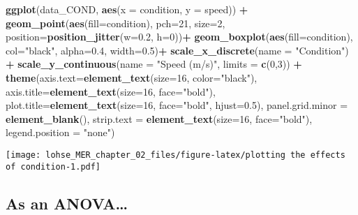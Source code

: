 \documentclass[]{article}
\newenvironment{Shaded}{\begin{snugshade}}{\end{snugshade}}
\newcommand{\DataTypeTok}[1]{\textcolor[rgb]{0.13,0.29,0.53}{#1}}
\newcommand{\DecValTok}[1]{\textcolor[rgb]{0.00,0.00,0.81}{#1}}
\newcommand{\FloatTok}[1]{\textcolor[rgb]{0.00,0.00,0.81}{#1}}
\newcommand{\KeywordTok}[1]{\textcolor[rgb]{0.13,0.29,0.53}{\textbf{#1}}}
\newcommand{\NormalTok}[1]{#1}
\newcommand{\OperatorTok}[1]{\textcolor[rgb]{0.81,0.36,0.00}{\textbf{#1}}}
\newcommand{\StringTok}[1]{\textcolor[rgb]{0.31,0.60,0.02}{#1}}
\begin{document}
\begin{Shaded}
\begin{Highlighting}[]
\KeywordTok{ggplot}\NormalTok{(data\_COND, }\KeywordTok{aes}\NormalTok{(}\DataTypeTok{x =}\NormalTok{ condition, }\DataTypeTok{y =}\NormalTok{ speed)) }\OperatorTok{+}
\StringTok{  }\KeywordTok{geom\_point}\NormalTok{(}\KeywordTok{aes}\NormalTok{(}\DataTypeTok{fill=}\NormalTok{condition), }\DataTypeTok{pch=}\DecValTok{21}\NormalTok{, }\DataTypeTok{size=}\DecValTok{2}\NormalTok{,}
             \DataTypeTok{position=}\KeywordTok{position\_jitter}\NormalTok{(}\DataTypeTok{w=}\FloatTok{0.2}\NormalTok{, }\DataTypeTok{h=}\DecValTok{0}\NormalTok{))}\OperatorTok{+}
\StringTok{  }\KeywordTok{geom\_boxplot}\NormalTok{(}\KeywordTok{aes}\NormalTok{(}\DataTypeTok{fill=}\NormalTok{condition), }\DataTypeTok{col=}\StringTok{"black"}\NormalTok{, }
               \DataTypeTok{alpha=}\FloatTok{0.4}\NormalTok{, }\DataTypeTok{width=}\FloatTok{0.5}\NormalTok{)}\OperatorTok{+}
\StringTok{  }\KeywordTok{scale\_x\_discrete}\NormalTok{(}\DataTypeTok{name =} \StringTok{"Condition"}\NormalTok{) }\OperatorTok{+}
\StringTok{  }\KeywordTok{scale\_y\_continuous}\NormalTok{(}\DataTypeTok{name =} \StringTok{"Speed (m/s)"}\NormalTok{, }\DataTypeTok{limits =} \KeywordTok{c}\NormalTok{(}\DecValTok{0}\NormalTok{,}\DecValTok{3}\NormalTok{)) }\OperatorTok{+}
\StringTok{  }\KeywordTok{theme}\NormalTok{(}\DataTypeTok{axis.text=}\KeywordTok{element\_text}\NormalTok{(}\DataTypeTok{size=}\DecValTok{16}\NormalTok{, }\DataTypeTok{color=}\StringTok{"black"}\NormalTok{), }
        \DataTypeTok{axis.title=}\KeywordTok{element\_text}\NormalTok{(}\DataTypeTok{size=}\DecValTok{16}\NormalTok{, }\DataTypeTok{face=}\StringTok{"bold"}\NormalTok{),}
        \DataTypeTok{plot.title=}\KeywordTok{element\_text}\NormalTok{(}\DataTypeTok{size=}\DecValTok{16}\NormalTok{, }\DataTypeTok{face=}\StringTok{"bold"}\NormalTok{, }\DataTypeTok{hjust=}\FloatTok{0.5}\NormalTok{),}
        \DataTypeTok{panel.grid.minor =} \KeywordTok{element\_blank}\NormalTok{(),}
        \DataTypeTok{strip.text =} \KeywordTok{element\_text}\NormalTok{(}\DataTypeTok{size=}\DecValTok{16}\NormalTok{, }\DataTypeTok{face=}\StringTok{"bold"}\NormalTok{),}
        \DataTypeTok{legend.position =} \StringTok{"none"}\NormalTok{)}
\end{Highlighting}
\end{Shaded}

\texttt{[image: lohse\_MER\_chapter\_02\_files/figure-latex/plotting the effects of condition-1.pdf]}

\hypertarget{as-an-anova}{%
\subsection{As an ANOVA\ldots{}}\label{as-an-anova}}
\end{document}
